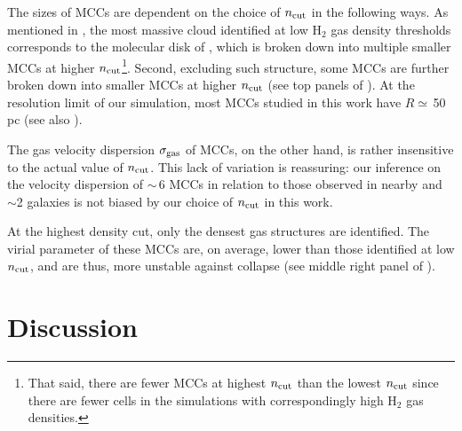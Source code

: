 \IfFileExists{emulateapjlegacy.cls}{\documentclass[iop]{emulateapjlegacy}}{\documentclass[iop]{emulateapj}}
\begin{document}
The sizes of MCCs are dependent on the choice of $n_{\rm cut}$ in the following ways.
As mentioned in , the most massive cloud identified at low H$_2$ gas density thresholds
corresponds to the molecular disk of \flower, which is broken down into multiple smaller MCCs at higher 
$n_{\rm cut}$\footnote{That said, there are fewer MCCs at highest $n_{\rm cut}$ than the lowest $n_{\rm cut}$ 
 since there are fewer cells in the simulations with correspondingly high H$_2$ gas densities.}.
Second, excluding such structure, some MCCs are further broken down into smaller MCCs at higher $n_{\rm cut}$ 
(see top panels of ). 
At the resolution limit of our simulation, most MCCs studied in this work have $R\simeq$\,50\,pc (see also ).
%

%
The gas velocity dispersion $\sigma_{\rm gas}$ of MCCs, on the other hand, is rather insensitive to the actual value of $n_{\rm cut}$.
This lack of variation is reassuring: our inference on the velocity dispersion of \z$\sim$\,6 MCCs in relation to those observed in
nearby and \z$\sim$2 galaxies is not biased by our choice of $n_{\rm cut}$ in this work.

At the highest density cut, only the densest gas structures are identified.
The virial parameter of these MCCs are, on average, lower than those identified at low $n_{\rm cut}$, and are thus, more 
unstable against collapse (see middle right panel of ).  


\section{Discussion}\label{sec:diss}
\end{document}
